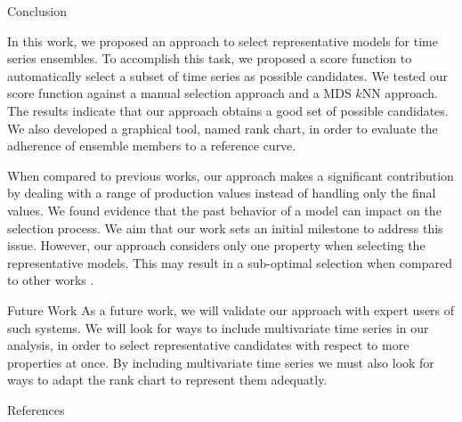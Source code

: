 \documentclass[final]{beamer}
\newlength{\twocolwid}
\begin{document}
\begin{frame}[t]
\begin{columns}[t]
\begin{column}{\twocolwid}
\begin{columns}[t,totalwidth=\twocolwid]
\begin{column}{\twocolwid}


\begin{block}{Conclusion}

In this work, we proposed an approach to select representative models for time series ensembles. To accomplish this task, we proposed a score function to automatically select a subset of time series as possible candidates. We tested our score function against a manual selection approach and a MDS $k$NN approach. The results indicate that our approach obtains a good set of possible candidates. We also developed a graphical tool, named rank chart, in order to evaluate the adherence of ensemble members to a reference curve.

When compared to previous works, our approach makes a significant contribution by dealing with a range of production values instead of handling only the final values. We found evidence that the past behavior of a model can impact on the selection process. We aim that our work sets an initial milestone to address this issue. However, our approach considers only one property when selecting the representative models. This may result in a sub-optimal selection when compared to other works \cite{selection-sarma:2013, meira:2016}.

\end{block}

\begin{block}{Future Work}
As a future work, we will validate our approach with expert users of such systems. We will look for ways to include multivariate time series in our analysis, in order to select representative candidates with respect to more properties at once. By including multivariate time series we must also look for ways to adapt the rank chart to represent them adequatly.
\end{block}



\begin{block}{References}
\small{
\vspace{0.75in}}
\end{block}


\end{column}
\end{columns}
\end{column}
\end{columns}
\end{frame}
\end{document}
